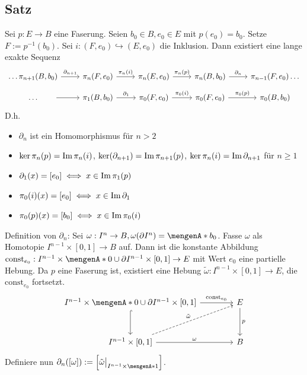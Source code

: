 \subsection[Satz: Existenz einer langen exakten Sequenz von Homotopiegruppen bei einer Faserung]{Satz} %
\label{sub:1411}
Sei $p : E \to B$ eine Faserung. Seien $b_0 \in B, e_0 \in E$ mit $p(e_0)= b_0$. Setze $F := p ^{-1}(b_0)$. Sei $i : (F, e_0) \hookrightarrow (E,e_0)$ die Inklusion.
Dann existiert eine lange exakte Sequenz
\[
	\begin{tikzcd}[row sep=1em]
		\ldots  \pi_{n+1}(B,b_0) \rar["\partial_{n+1}"] & \pi_n(F,e_0) \rar["\pi_n(i)"] & \pi_n(E,e_0) \rar["\pi_n(p)"]& \pi_n(B,b_0)  \rar["\partial_n"]& \pi_{n-1}(F,e_0) \ldots  \\
		\qquad \ldots  \qquad  \rar & \pi_1(B,b_0) \rar["\partial_1"] & \pi_0(F,e_0) \rar["\pi_0(i)"]& \pi_0(F,e_0) \rar["\pi_0(p)"]& \pi_0(B,b_0)
	\end{tikzcd}
\]
D.h.
\begin{itemize}
	\item $\partial_n$ ist ein Homomorphismus für $n >2$
	\item $\ker \pi_n(p) = \operatorname{Im} \pi_n(i)$, $\ker( \partial_{n+1}) = \operatorname{Im} \pi_{n+1}(p)$, $\ker \pi_n(i) = \operatorname{Im} \partial_{n+1}$ für $n \ge 1$
	\item $\partial_1(x) = [e_0] \iff x \in \operatorname{Im} \pi_1(p)$
	\item $\pi_0(i)(x) = [e_0] \iff x \in \operatorname{Im} \partial_1$
	\item $\pi_0(p)(x) = [b_0] \iff x \in \operatorname{Im} \pi_0 (i)$
\end{itemize}
Definition von $\partial_n$: Sei $\omega : I^n \to B, \omega(\partial I^n) = \set{b_0} $. Fasse $\omega$ als Homotopie $I^{n-1} \times [0,1] \to B$ auf.
Dann ist die konstante Abbildung $\mathrm{const}_{e_0} : I^{n-1} \times \set{0} \cup \partial I^{n-1} \times [0,1] \to E$ mit Wert $e_0$ eine partielle Hebung.
Da $p$ eine Faserung ist, existiert eine Hebung $\tilde{\omega} : I^{n-1} \times [0,1] \to E$, die $\mathrm{const}_{e_0}$ fortsetzt.
\[
	\begin{tikzcd}[row sep=3em, column sep=4em]
		I^{n-1} \times \set{0} \cup \partial I^{n-1} \times [0,1] \rar["\mathrm{const}_{e_0}"] \dar[hook]& E \dar["p"] \\
		I^{n-1} \times [0,1] \rar["\omega"] \urar[dashed, "\tilde{\omega}"]& B 
	\end{tikzcd}
\]
Definiere nun $\partial_n([\omega]) := \benbrace*{\tilde{\omega}\big|_{I^{n-1} \times \set{1}}} $. 
